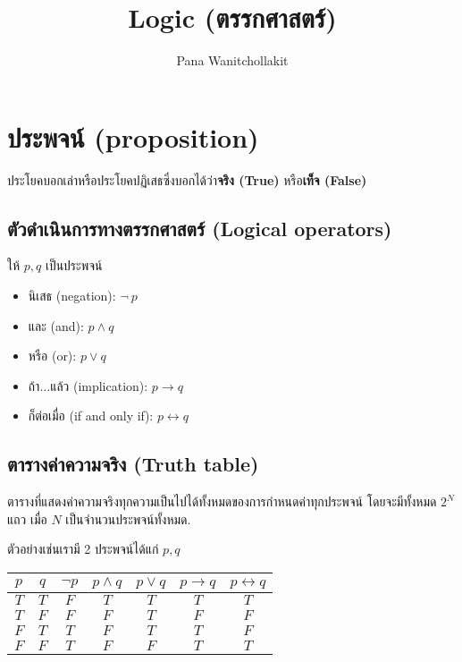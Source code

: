 \documentclass[12pt,a4paper]{article}
\title{
	Logic (ตรรกศาสตร์)
}
\author{
    Pana Wanitchollakit
}
\date{
}
\begin{document}
\maketitle

\section*{ประพจน์ (proposition)}
ประโยคบอกเล่าหรือประโยคปฏิเสธซึ่งบอกได้ว่า\textbf{จริง (True)} หรือ\textbf{เท็จ (False)}
\subsection*{ตัวดำเนินการทางตรรกศาสตร์ (Logical operators)}
ให้ $p, q$ เป็นประพจน์
\begin{itemize}
    \item นิเสธ (negation): $\neg\ p$
    \item และ (and): $p\land q$
    \item หรือ (or): $p \lor q$
    \item ถ้า$\ldots$แล้ว (implication): $p \rightarrow q$
    \item ก็ต่อเมื่อ (if and only if): $p\leftrightarrow q$
\end{itemize}
\subsection*{ตารางค่าความจริง (Truth table)}
\quad ตารางที่แสดงค่าความจริงทุกความเป็นไปได้ทั้งหมดของการกำหนดค่าทุกประพจน์ โดยจะมีทั้งหมด $2^N$ แถว เมื่อ $N$ เป็นจำนวนประพจน์ทั้งหมด. \\
\rule{0pt}{4ex}
ตัวอย่างเช่นเรามี 2 ประพจน์ได้แก่ $p, q$\\
\begin{center}
    \begin{tabular}{|c|c||c|c|c|c|c|}
        \hline
        $p$ & $q$ & $\neg p$ & $p \land q$ & $p \lor q$ & $p \rightarrow q$ & $p \leftrightarrow q$ \\
        \hline
        $T$ & $T$ & $F$      & $T$         & $T$        & $T$               & $T$                   \\
        \hline
        $T$ & $F$ & $F$      & $F$         & $T$        & $F$               & $F$                   \\
        \hline
        $F$ & $T$ & $T$      & $F$         & $T$        & $T$               & $F$                   \\
        \hline
        $F$ & $F$ & $T$      & $F$         & $F$        & $T$               & $T$                   \\
        \hline
    \end{tabular}
\end{center}
\end{document}
